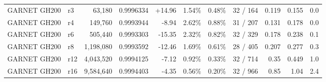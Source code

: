 \begin{tabular}{llrrrrrrrrr}
GARNET GH200 & r3 & 63,180 & 0.9996334 & +14.96 & 1.54\% & 0.48\% & 32 / 164 & 0.119 & 0.155 & 0.0 \\
GARNET GH200 & r4 & 149,760 & 0.9993944 & -8.94 & 2.62\% & 0.88\% & 31 / 207 & 0.131 & 0.178 & 0.0 \\
GARNET GH200 & r6 & 505,440 & 0.9993303 & -15.35 & 2.32\% & 0.82\% & 32 / 329 & 0.178 & 0.238 & 0.1 \\
GARNET GH200 & r8 & 1,198,080 & 0.9993592 & -12.46 & 1.69\% & 0.61\% & 28 / 405 & 0.207 & 0.277 & 0.3 \\
GARNET GH200 & r12 & 4,043,520 & 0.9994125 & -7.12 & 0.92\% & 0.33\% & 32 / 714 & 0.35 & 0.449 & 1.0 \\
GARNET GH200 & r16 & 9,584,640 & 0.9994403 & -4.35 & 0.56\% & 0.20\% & 32 / 966 & 0.85 & 1.04 & 2.4 \\
\hline
\end{tabular}
